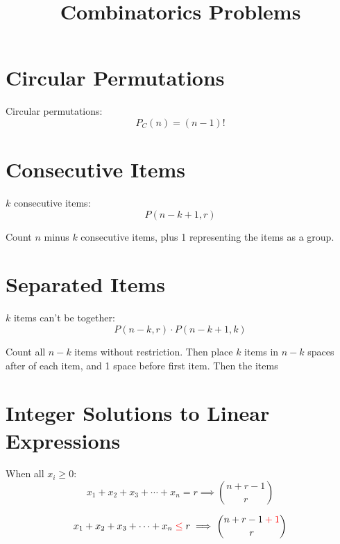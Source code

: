 \documentclass{article}
\title{Combinatorics Problems}
\begin{document}
    \maketitle

    \tableofcontents

    \section{Circular Permutations}

    Circular permutations: \begin{equation}
        P_C(n) = (n - 1)!
    \end{equation}

    \section{Consecutive Items}

    $k$ consecutive items: \begin{equation}
        P(n - k + 1, r)
    \end{equation}

    Count $n$ minus $k$ consecutive items, plus 1 representing the items as a group.

    \section{Separated Items}

    $k$ items can't be together: \begin{equation}
        P(n - k, r) \cdot P(n - k + 1, k)
    \end{equation}

    Count all $n - k$ items without restriction. Then place $k$ items in $n - k$ spaces after of each item, and 1 space before first item. Then the items

    \section{Integer Solutions to Linear Expressions}

    When all $x_i \geq 0$: \begin{equation}
        x_1 + x_2 + x_3 + \cdots + x_n = r \implies {n + r - 1 \choose r}
    \end{equation}
    
    \begin{equation}
        x_1 + x_2 + x_3 + \cdots + x_n \color{red}\leq\color{black} r \implies {n + r - 1 \color{red}+ 1\color{black} \choose r}
    \end{equation}
    
\end{document}
